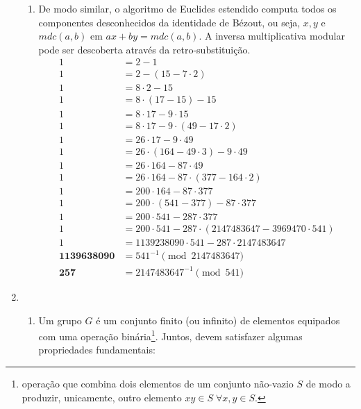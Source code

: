 \documentclass[fleqn]{article}
\begin{document}
\begin{enumerate}[label=\textbf{\arabic*})]
\begin{enumerate}
\item De modo similar, o algoritmo de Euclides estendido computa todos os
componentes desconhecidos da identidade de Bézout, ou seja, $x, y$ e
$mdc(a, b)$ em $ax + by = mdc(a, b)$. A inversa multiplicativa modular pode
ser descoberta através da retro-substituição.
\begin{align*}
1 &= 2 - 1 \\
1 &= 2 - (15 - 7 \cdot 2) \\
1 &= 8 \cdot 2 - 15 \\
1 &= 8 \cdot (17 - 15) - 15 \\
1 &= 8 \cdot 17 - 9 \cdot 15 \\
1 &= 8 \cdot 17 - 9 \cdot (49 - 17 \cdot 2) \\
1 &= 26 \cdot 17 - 9 \cdot 49 \\
1 &= 26 \cdot (164 - 49 \cdot 3) - 9 \cdot 49 \\
1 &= 26 \cdot 164 - 87 \cdot 49 \\
1 &= 26 \cdot 164 - 87 \cdot (377 - 164 \cdot 2) \\
1 &= 200 \cdot 164 - 87 \cdot 377 \\
1 &= 200 \cdot (541 - 377) - 87 \cdot 377 \\
1 &= 200 \cdot 541 - 287 \cdot 377 \\
1 &= 200 \cdot 541 - 287 \cdot (2147483647 - 3969470 \cdot 541) \\
1 &= 1139238090 \cdot 541 - 287 \cdot 2147483647 \\
\boldsymbol{1139638090} &= 541^{-1} \pmod{2147483647} \\
\boldsymbol{257} &= 2147483647^{-1} \pmod{541}
\end{align*}

\end{enumerate}

\newpage

\item

\begin{enumerate}

\item Um grupo $G$ é um conjunto finito (ou infinito) de elementos equipados
com uma operação binária\footnote{operação que combina dois elementos de um
conjunto não-vazio $S$ de modo a produzir, unicamente, outro elemento
$xy \in S \; \forall x, y \in S$.}. Juntos, devem satisfazer algumas
propriedades fundamentais:

\begin{enumerate}


\end{enumerate}
\end{enumerate}
\end{enumerate}
\end{document}
